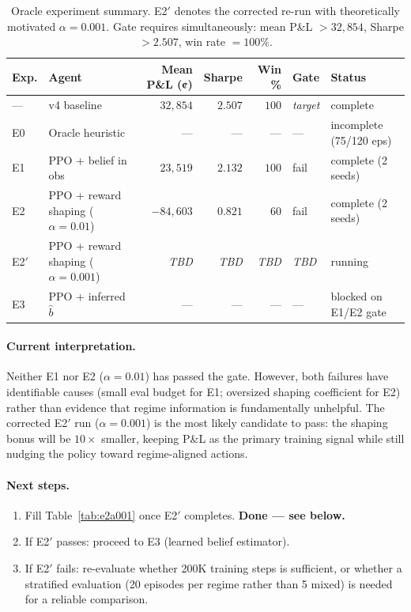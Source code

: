 \documentclass[11pt]{article}
\newcommand{\tbd}{\emph{TBD}}
\begin{document}
\begin{table}[H]
\centering
\begin{tabular}{llrrrll}
\toprule
\textbf{Exp.} &
\textbf{Agent} &
\textbf{Mean P\&L (¢)} &
\textbf{Sharpe} &
\textbf{Win \%} &
\textbf{Gate} &
\textbf{Status} \\
\midrule
--- & v4 baseline & $32{,}854$ & $2.507$ & $100$ & \textit{target} & complete \\
\midrule
E0 & Oracle heuristic & --- & --- & --- & --- & incomplete (75/120 eps) \\
E1 & PPO + belief in obs & $23{,}519$ & $2.132$ & $100$ & fail & complete (2 seeds) \\
E2 & PPO + reward shaping ($\alpha=0.01$) & $-84{,}603$ & $0.821$ & $60$ & fail & complete (2 seeds) \\
E2$'$ & PPO + reward shaping ($\alpha=0.001$) & \tbd & \tbd & \tbd & \tbd & running \\
E3 & PPO + inferred $\hat{b}$ & --- & --- & --- & --- & blocked on E1/E2 gate \\
\bottomrule
\end{tabular}
\caption{Oracle experiment summary.
         E2$'$ denotes the corrected re-run with theoretically motivated
         $\alpha=0.001$. Gate requires simultaneously: mean P\&L $>32{,}854$,
         Sharpe $>2.507$, win rate $=100\%$.}
\label{tab:summary}
\end{table}

\paragraph{Current interpretation.}
Neither E1 nor E2 ($\alpha=0.01$) has passed the gate.
However, both failures have identifiable causes (small eval budget for E1;
oversized shaping coefficient for E2) rather than evidence that regime
information is fundamentally unhelpful.
The corrected E2$'$ run ($\alpha=0.001$) is the most likely candidate to
pass: the shaping bonus will be $10\times$ smaller, keeping P\&L as the
primary training signal while still nudging the policy toward regime-aligned
actions.

\paragraph{Next steps.}
\begin{enumerate}
  \item Fill Table~\ref{tab:e2a001} once E2$'$ completes. \textbf{Done --- see below.}
  \item If E2$'$ passes: proceed to E3 (learned belief estimator).
  \item If E2$'$ fails: re-evaluate whether 200K training steps is
        sufficient, or whether a stratified evaluation (20 episodes per
        regime rather than 5 mixed) is needed for a reliable comparison.
\end{enumerate}
\end{document}
